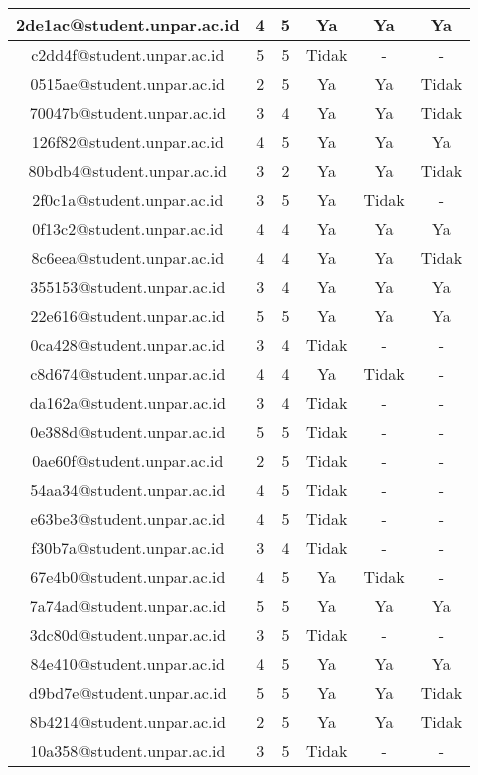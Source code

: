 \begin{longtable}{|c|c|c|c|c|c|}
\hline	2de1ac@student.unpar.ac.id	&	4	&	5	&	Ya	&	Ya	&	Ya	\\
\hline	c2dd4f@student.unpar.ac.id	&	5	&	5	&	Tidak	&	-	&	-	\\
\hline	0515ae@student.unpar.ac.id	&	2	&	5	&	Ya	&	Ya	&	Tidak	\\
\hline	70047b@student.unpar.ac.id	&	3	&	4	&	Ya	&	Ya	&	Tidak	\\
\hline	126f82@student.unpar.ac.id	&	4	&	5	&	Ya	&	Ya	&	Ya	\\
\hline	80bdb4@student.unpar.ac.id	&	3	&	2	&	Ya	&	Ya	&	Tidak	\\
\hline	2f0c1a@student.unpar.ac.id	&	3	&	5	&	Ya	&	Tidak	&	-	\\
\hline	0f13c2@student.unpar.ac.id	&	4	&	4	&	Ya	&	Ya	&	Ya	\\
\hline	8c6eea@student.unpar.ac.id	&	4	&	4	&	Ya	&	Ya	&	Tidak	\\
\hline	355153@student.unpar.ac.id	&	3	&	4	&	Ya	&	Ya	&	Ya	\\
\hline	22e616@student.unpar.ac.id	&	5	&	5	&	Ya	&	Ya	&	Ya	\\
\hline	0ca428@student.unpar.ac.id	&	3	&	4	&	Tidak	&	-	&	-	\\
\hline	c8d674@student.unpar.ac.id	&	4	&	4	&	Ya	&	Tidak	&	-	\\
\hline	da162a@student.unpar.ac.id	&	3	&	4	&	Tidak	&	-	&	-	\\
\hline	0e388d@student.unpar.ac.id	&	5	&	5	&	Tidak	&	-	&	-	\\
\hline	0ae60f@student.unpar.ac.id	&	2	&	5	&	Tidak	&	-	&	-	\\
\hline	54aa34@student.unpar.ac.id	&	4	&	5	&	Tidak	&	-	&	-	\\
\hline	e63be3@student.unpar.ac.id	&	4	&	5	&	Tidak	&	-	&	-	\\
\hline	f30b7a@student.unpar.ac.id	&	3	&	4	&	Tidak	&	-	&	-	\\
\hline	67e4b0@student.unpar.ac.id	&	4	&	5	&	Ya	&	Tidak	&	-	\\
\hline	7a74ad@student.unpar.ac.id	&	5	&	5	&	Ya	&	Ya	&	Ya	\\
\hline	3dc80d@student.unpar.ac.id	&	3	&	5	&	Tidak	&	-	&	-	\\
\hline	84e410@student.unpar.ac.id	&	4	&	5	&	Ya	&	Ya	&	Ya	\\
\hline	d9bd7e@student.unpar.ac.id	&	5	&	5	&	Ya	&	Ya	&	Tidak	\\
\hline	8b4214@student.unpar.ac.id	&	2	&	5	&	Ya	&	Ya	&	Tidak	\\
\hline	10a358@student.unpar.ac.id	&	3	&	5	&	Tidak	&	-	&	-	\\

\end{longtable}
